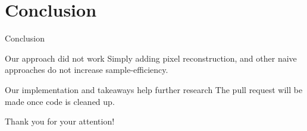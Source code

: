 \documentclass{beamer}
\begin{document}
\section{Conclusion}

\begin{frame}{Conclusion}
	\begin{alertblock}{Our approach did not work}
			Simply adding pixel reconstruction, and other naive approaches 
			do not increase sample-efficiency.
	\end{alertblock}
	\pause
	\begin{exampleblock}{Our implementation and takeaways help further research}
			The pull request will be made once code is cleaned up.
	\end{exampleblock}
		
\end{frame}

\begin{frame}[focus]
	Thank you for your attention!
\end{frame}
\end{document}
